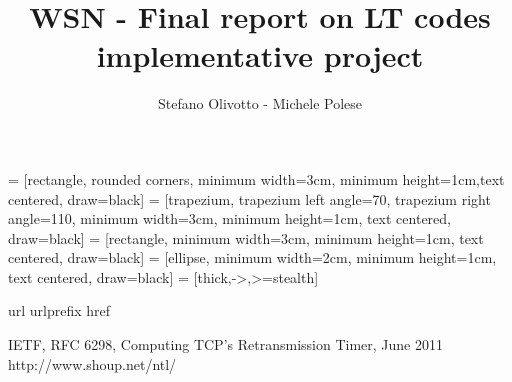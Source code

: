 \documentclass[12pt, titlepage]{article}
\begin{document}
\title{WSN - Final report on LT codes implementative project}
\author{Stefano Olivotto - Michele Polese}
\maketitle

 = [rectangle, rounded corners, minimum width=3cm, minimum height=1cm,text centered, draw=black]
 = [trapezium, trapezium left angle=70, trapezium right angle=110, minimum width=3cm, minimum height=1cm, text centered, draw=black]
 = [rectangle, minimum width=3cm, minimum height=1cm, text centered, draw=black]
 = [ellipse, minimum width=2cm, minimum height=1cm, text centered, draw=black]
 = [thick,->,>=stealth]







\begin{thebibliography}{10}
\expandafter\ifx\csname url\endcsname\relax
  \def\url#1{\texttt{#1}}\fi
\expandafter\ifx\csname urlprefix\endcsname\relax\def\urlprefix{URL }\fi
\expandafter\ifx\csname href\endcsname\relax
  \def\href#1#2{#2} \def\path#1{#1}\fi
  
 IETF, RFC 6298, Computing TCP's Retransmission Timer, June 2011
 http://www.shoup.net/ntl/
\end{thebibliography}
\end{document}
